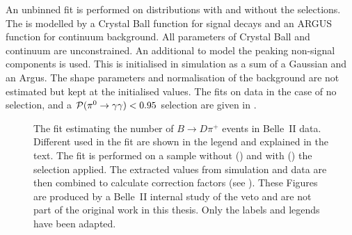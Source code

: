 An unbinned \Mbc fit is performed on distributions with and without the \piVeto selections.
The \Mbc is modelled by a Crystal Ball function for signal decays and an ARGUS function for continuum background.
All parameters of Crystal Ball and continuum are unconstrained.
An additional \PDF to model the peaking non-signal \BB components is used.
This \PDF is initialised in simulation as a sum of a Gaussian and an Argus.
The shape parameters and normalisation of the \BB background \PDF are not estimated but kept at the initialised values.
The fits on data in the case of no \piVeto selection, and a ${\mathcal{P}(\pi^0\rightarrow\gamma\gamma)}<0.95$ selection are given in .
\begin{figure}[htbp!]
    \centering
    \caption{\label{fig:pivetofit} The fit estimating the number of $B\to D \pi^+$ events in Belle~II data.
    Different  used in the fit are shown in the legend and explained in the text.
    The fit is performed on a sample without () and with () the \piVeto selection applied.
    The extracted values from simulation and data are then combined to calculate \piVeto correction factors (see ).
    These Figures are produced by a Belle~II internal study of the \piz veto and are not part of the original work in this thesis.
    Only the labels and legends have been adapted.    
    }
\end{figure}

